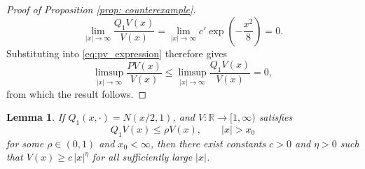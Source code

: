 \documentclass{article}
\theoremstyle{definition}
\theoremstyle{plain}
\newtheorem{lemma}[definition]{Lemma}
\begin{document}
\begin{proof}[Proof of Proposition \ref{prop: counterexample}]
\begin{equation*}
    \lim_{|x|\to\infty}\frac{Q_1V(x)}{V(x)}  = \lim_{|x|\to\infty}c'\exp\left(-\frac{x^2}{8}\right)=0.
\end{equation*}
Substituting into \eqref{eq:pv_expression} therefore gives
\begin{equation*}
    \limsup_{|x|\to\infty} \frac{PV(x)}{V(x)}
    \le 
    \limsup_{|x|\to\infty}\frac{Q_1V(x)}{V(x)} = 0,
\end{equation*}
from which the result follows.
\end{proof}

\begin{lemma}
\label{lem:ar1_vgrowth}
If $Q_1(x,\cdot) = N(x/2, 1)$, and $V : \mathbb{R} \to [1, \infty)$ satisfies
\begin{equation}\label{eq:drift}
    Q_1 V(x) \leq \rho V(x), \qquad |x| > x_0
\end{equation}
for some $\rho \in (0,1)$ and $x_0 < \infty$, then there exist constants $c > 0$ and $\eta > 0$ such that $V(x) \geq c\, |x|^{\eta}$ for all sufficiently large $|x|$.
\end{lemma}
\end{document}

